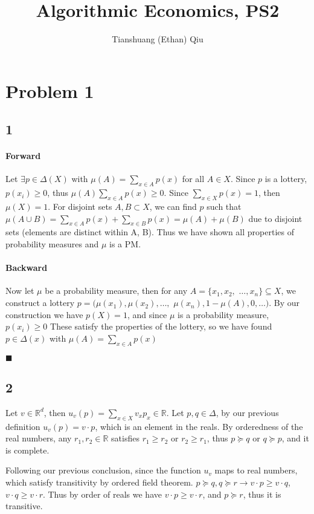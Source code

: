 \documentclass[12pt]{article}
\author{Tianshuang (Ethan) Qiu}
\newcommand{\R}{\mathbb{R}}
\begin{document}
\title{Algorithmic Economics, PS2}
\maketitle

\section*{Problem 1}
\subsection*{1}
\paragraph*{Forward}
Let $\exists p \in \Delta(X)$ with $\mu(A) = \sum_{x\in A}p(x)$
for all $A \in X$. Since $p$ is a lottery, $p(x_i)\geq 0$, thus 
$\mu(A)\sum_{x\in A}p(x) \geq 0$. Since $\sum_{x\in X} p(x)=1$, then 
$\mu(X) = 1$. For disjoint sets $A, B \subset X$, we can find $p$ such that 
$\mu(A \cup B) = \sum_{x \in A}p(x) +\sum_{x \in B}p(x) = \mu(A) + \mu(B)$ due 
to disjoint sets (elements are distinct within A, B). Thus we have shown all 
properties of probability measures and $\mu$ is a PM.

\paragraph*{Backward}
Now let $\mu$ be a probability measure, then for any 
$A = \{x_1, x_2,$ $ \ldots, x_n\}  \subseteq X$, 
we construct a lottery $p = (\mu(x_1), \mu(x_2), \ldots,$ $ \mu(x_n), 1-\mu(A), 0, \ldots)$.
By our construction we have $p(X)=1$, and since $\mu$ is a probability measure, $p(x_i)\geq 0$
These satisfy the properties of the lottery, so we have found $p \in \Delta(x)$ with 
$\mu(A)=\sum_{x\in A}p(x)$

$\blacksquare$
\newpage



\subsection*{2}
Let $v \in \R^d$, then $u_v(p) = \sum_{x\in X} v_x p_x \in \R$. 
Let $p, q \in \Delta$, by our previous definition $u_v(p) = v \cdot p$, which is an element in 
the reals. By orderedness of the real numbers, any $r_1, r_2 \in \R$ satisfies $r_1 \geq r_2$ or 
$r_2 \geq r_1$, thus $p \succeq q$ or $q \succeq p$, and it is complete.

Following our previous conclusion, since the function $u_v$ maps to real numbers, 
which satisfy transitivity by ordered field theorem. $p \succeq q, q \succeq r \to v \cdot p \geq v \cdot q$, $v \cdot q \geq v \cdot r$.
Thus by order of reals we have $v \cdot p \geq v \cdot r$, and $p \succeq r$, thus it is transitive.
\end{document}
